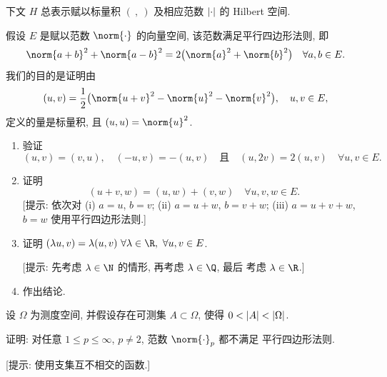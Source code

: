 下文 $H$ 总表示赋以标量积 $(\ ,\ )$ 及相应范数 $\left|\cdot\right|$ 的 Hilbert 空间.

\begin{exercise}[平行四边形法则.]
\label{exer:5.1}
假设 $E$ 是赋以范数 $\norm{\cdot}$ 的向量空间, 该范数满足平行四边形法则, 即
\begin{equation*}
\norm{a+b}^2+\norm{a-b}^2=2\bigl(\norm{a}^2+\norm{b}^2\bigr)
\quad\forall a,b\in E.
\end{equation*}
我们的目的是证明由
\begin{equation*}
(u,v)=\frac12\bigl(\norm{u+v}^2-\norm{u}^2-\norm{v}^2\bigr),
\quad u,v\in E,
\end{equation*}
定义的量是标量积, 且 $(u,u)=\norm{u}^2$.
\begin{enumerate}[label=\arabic*., leftmargin=2.2em, itemsep=0.3em]
	\item 验证
	      \begin{equation*}
	      (u,v)=(v,u),\quad(-u,v)=-(u,v)\quad\text{且}\quad(u,2v)=2(u,v)
	      \quad\forall u,v\in E.
	      \end{equation*}
	\item 证明
	      \begin{equation*}
	      (u+v,w)=(u,w)+(v,w)\quad\forall u,v,w\in E.
	      \end{equation*}
	      [提示: 依次对 (i) $a=u$, $b=v$; (ii) $a=u+w$, $b=v+w$;
	      (iii) $a=u+v+w$, $b=w$ 使用平行四边形法则.]
	\item 证明 $(\lambda u,v)=\lambda(u,v)\ \forall\lambda\in\R,\ \forall u,v\in E$.

	      [提示: 先考虑 $\lambda\in\N$ 的情形, 再考虑 $\lambda\in\Q$, 最后
	      考虑 $\lambda\in\R$.]
	\item 作出结论.
\end{enumerate}
\end{exercise}

\begin{exercise}[当 $p\ne2$ 时 $L^p$ 不是 Hilbert 空间.]
\label{exer:5.2}
设 $\Omega$ 为测度空间, 并假设存在可测集 $A\subset\Omega$, 使得
$0<\left|A\right|<\left|\Omega\right|$.

证明: 对任意 $1\le p\le\infty$, $p\ne2$, 范数 $\norm{\cdot}_p$ 都不满足
平行四边形法则.

[提示: 使用支集互不相交的函数.]
\end{exercise}

